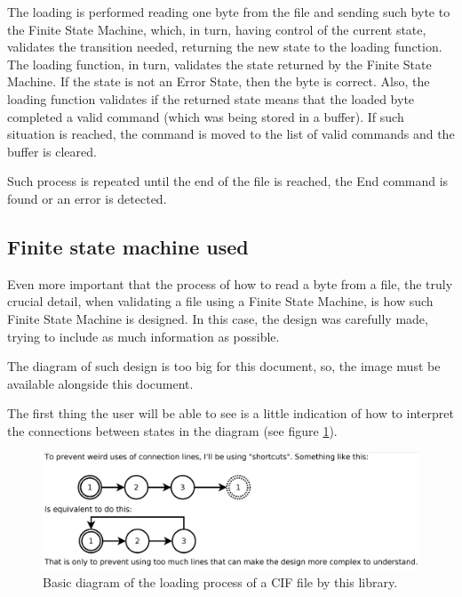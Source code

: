 \documentclass[11pt,twoside,openany,x11names,svgnames]{memoir}
\begin{document}
The loading is performed reading one byte from the file and sending such byte to the Finite State Machine, which, in turn, having control of the current state, validates the transition needed, returning the new state to the loading function. The loading function, in turn, validates the state returned by the Finite State Machine. If the state is not an Error State, then the byte is correct. Also, the loading function validates if the returned state means that the loaded byte completed a valid command (which was being stored in a buffer). If such situation is reached, the command is moved to the list of valid commands and the buffer is cleared.

Such process is repeated until the end of the file is reached, the End command is found or an error is detected.

\subsection{Finite state machine used}\label{Finite-state-machine-used}

Even more important that the process of how to read a byte from a file, the truly crucial detail, when validating a file using a Finite State Machine, is how such Finite State Machine is designed. In this case, the design was carefully made, trying to include as much information as possible.

The diagram of such design is too big for this document, so, the image must be available alongside this document.

The first thing the user will be able to see is a little indication of how to interpret the connections between states in the diagram (see figure \ref{fig:fsmconnections}).

\begin{figure}
	\centering
	\includegraphics[scale=0.5, clip=true, trim= 0pt 0pt 0pt 0pt]{images/chapter03-image08}
	\caption{Basic diagram of the loading process of a CIF file by this library.}
	\label{fig:fsmconnections}
\end{figure}
\end{document}
